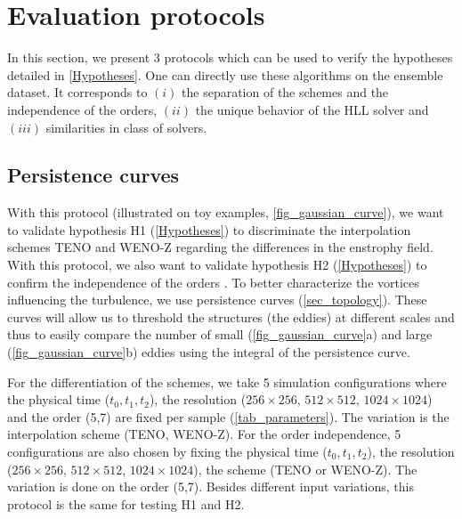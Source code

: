 


\section{Evaluation protocols}
\label{sec_protocols}
In this section, we present 3 protocols which can be used to verify the
hypotheses detailed in \autoref{Hypotheses}. One can directly use these
algorithms on the ensemble dataset. It corresponds to $(i)$ the separation of
the schemes and the independence of the orders, $(ii)$ the unique behavior of
the HLL solver and $(iii)$ similarities in class of solvers.


\subsection{Persistence curves}
\label{sec_persistence}
With this protocol (illustrated on toy examples, \autoref{fig_gaussian_curve}), we want to validate hypothesis H1 (\autoref{Hypotheses}) to discriminate the interpolation schemes TENO and WENO-Z regarding the differences in the enstrophy field. With this protocol, we also want to validate hypothesis H2 (\autoref{Hypotheses}) to confirm the independence of the orders \cite{san2015evaluation}. To better characterize the vortices influencing the turbulence, we use persistence curves (\autoref{sec_topology}). These curves will
allow us to threshold the structures (the eddies) at different scales and
thus to easily compare the number of small (\autoref{fig_gaussian_curve}a) and large (\autoref{fig_gaussian_curve}b) eddies using the integral of the persistence curve.

For the differentiation of the schemes, we take 5 simulation configurations where the physical time ($t_0,t_1,t_2$), the resolution ($256\times 256$, $512\times 512$, $ 1024\times 1024$) and the order (5,7) are fixed per sample (\autoref{tab_parameters}). The variation is the interpolation scheme (TENO, WENO-Z). For the order independence, 5 configurations are also chosen by fixing the physical time ($t_0,t_1,t_2$), the resolution ($256\times 256$, $512\times 512$, $ 1024\times 1024$), the scheme (TENO or WENO-Z). The variation is done on the order (5,7). Besides different input variations,
this protocol is the same for testing H1 and H2.

